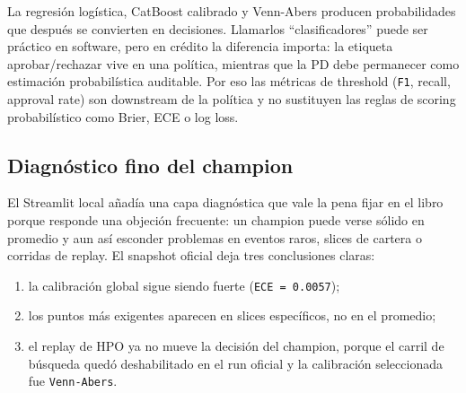 \documentclass[
  spanish,
  11pt,
  letterpaper,
]{scrbook}
\providecommand{\tightlist}{%
  \setlength{\itemsep}{0pt}\setlength{\parskip}{0pt}}
\theoremstyle{plain}
\theoremstyle{remark}
\begin{document}
\begin{tcolorbox}[enhanced jigsaw, arc=.35mm, bottomrule=.15mm, bottomtitle=1mm, breakable, colback=white, colbacktitle=quarto-callout-note-color!10!white, colframe=quarto-callout-note-color-frame, coltitle=black, left=2mm, leftrule=.75mm, opacityback=0, opacitybacktitle=0.6, rightrule=.15mm, title=\textcolor{quarto-callout-note-color}{\faInfo}\hspace{0.5em}{Probabilidad antes que etiqueta}, titlerule=0mm, toprule=.15mm, toptitle=1mm]

La regresión logística, CatBoost calibrado y Venn-Abers producen
probabilidades que después se convierten en decisiones. Llamarlos
``clasificadores'' puede ser práctico en software, pero en crédito la
diferencia importa: la etiqueta aprobar/rechazar vive en una política,
mientras que la PD debe permanecer como estimación probabilística
auditable. Por eso las métricas de threshold (\texttt{F1}, recall,
approval rate) son downstream de la política y no sustituyen las reglas
de scoring probabilístico como Brier, ECE o log loss.

\end{tcolorbox}

\subsection{Diagnóstico fino del
champion}\label{diagnuxf3stico-fino-del-champion}

El Streamlit local añadía una capa diagnóstica que vale la pena fijar en
el libro porque responde una objeción frecuente: un champion puede verse
sólido en promedio y aun así esconder problemas en eventos raros, slices
de cartera o corridas de replay. El snapshot oficial deja tres
conclusiones claras:

\begin{enumerate}
\def\labelenumi{\arabic{enumi}.}
\tightlist
\item
  la calibración global sigue siendo fuerte (\texttt{ECE\ =\ 0.0057});
\item
  los puntos más exigentes aparecen en slices específicos, no en el
  promedio;
\item
  el replay de HPO ya no mueve la decisión del champion, porque el
  carril de búsqueda quedó deshabilitado en el run oficial y la
  calibración seleccionada fue \texttt{Venn-Abers}.
\end{enumerate}
\end{document}
